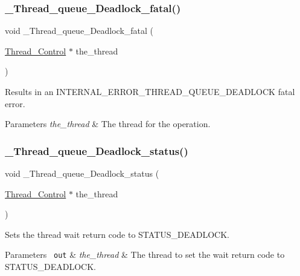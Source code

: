 \subsubsection{\texorpdfstring{\_Thread\_queue\_Deadlock\_fatal()}{\_Thread\_queue\_Deadlock\_fatal()}}
{\footnotesize\ttfamily void \+\_\+\+Thread\+\_\+queue\+\_\+\+Deadlock\+\_\+fatal (\begin{DoxyParamCaption}\item[{\mbox{\hyperlink{struct__Thread__Control}{Thread\+\_\+\+Control}} $\ast$}]{the\+\_\+thread }\end{DoxyParamCaption})}



Results in an I\+N\+T\+E\+R\+N\+A\+L\+\_\+\+E\+R\+R\+O\+R\+\_\+\+T\+H\+R\+E\+A\+D\+\_\+\+Q\+U\+E\+U\+E\+\_\+\+D\+E\+A\+D\+L\+O\+CK fatal error. 


\begin{DoxyParams}{Parameters}
{\em the\+\_\+thread} & The thread for the operation. \\
\hline
\end{DoxyParams}
\mbox{\label{group__RTEMSScoreThreadQueue_gaca11db0fbad98d6b0ee9a41139aa7d54}} 
\subsubsection{\texorpdfstring{\_Thread\_queue\_Deadlock\_status()}{\_Thread\_queue\_Deadlock\_status()}}
{\footnotesize\ttfamily void \+\_\+\+Thread\+\_\+queue\+\_\+\+Deadlock\+\_\+status (\begin{DoxyParamCaption}\item[{\mbox{\hyperlink{struct__Thread__Control}{Thread\+\_\+\+Control}} $\ast$}]{the\+\_\+thread }\end{DoxyParamCaption})}



Sets the thread wait return code to S\+T\+A\+T\+U\+S\+\_\+\+D\+E\+A\+D\+L\+O\+CK. 


\begin{DoxyParams}[1]{Parameters}
\mbox{\texttt{ out}}  & {\em the\+\_\+thread} & The thread to set the wait return code to S\+T\+A\+T\+U\+S\+\_\+\+D\+E\+A\+D\+L\+O\+CK. \\
\hline
\end{DoxyParams}
\mbox{\label{group__RTEMSScoreThreadQueue_gaa59fb38f22e409d05123df6627ead47a}} 
